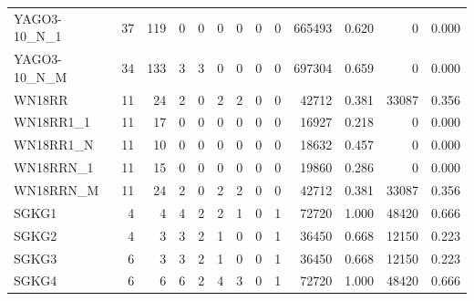 \begin{table}[t]
{\begin{tabular}{l|r||rrrr||rrr||rr||rr}
YAGO3-10\_N\_1 & 37 & 119 & 0 & 0 & 0 & 0 & 0 & 0 & 665493 & 0.620 & 0 & 0.000 \\
YAGO3-10\_N\_M & 34 & 133 & 3 & 3 & 0 & 0 & 0 & 0 & 697304 & 0.659 & 0 & 0.000 \\
\hline
WN18RR & 11 & 24 & 2 & 0 & 2 & 2 & 0 & 0 & 42712 & 0.381 & 33087 & 0.356 \\
WN18RR1\_1 & 11 & 17 & 0 & 0 & 0 & 0 & 0 & 0 & 16927 & 0.218 & 0 & 0.000 \\
WN18RR1\_N & 11 & 10 & 0 & 0 & 0 & 0 & 0 & 0 & 18632 & 0.457 & 0 & 0.000 \\
WN18RRN\_1 & 11 & 15 & 0 & 0 & 0 & 0 & 0 & 0 & 19860 & 0.286 & 0 & 0.000 \\
WN18RRN\_M & 11 & 24 & 2 & 0 & 2 & 2 & 0 & 0 & 42712 & 0.381 & 33087 & 0.356 \\
\hline
SGKG1 & 4 & 4 & 4 & 2 & 2 & 1 & 0 & 1 & 72720 & 1.000 & 48420 & 0.666 \\
SGKG2 & 4 & 3 & 3 & 2 & 1 & 0 & 0 & 1 & 36450 & 0.668 & 12150 & 0.223 \\
SGKG3 & 6 & 3 & 3 & 2 & 1 & 0 & 0 & 1 & 36450 & 0.668 & 12150 & 0.223 \\
SGKG4 & 6 & 6 & 6 & 2 & 4 & 3 & 0 & 1 & 72720 & 1.000 & 48420 & 0.666 \\
\hline
\end{tabular}%
}
\end{table}
